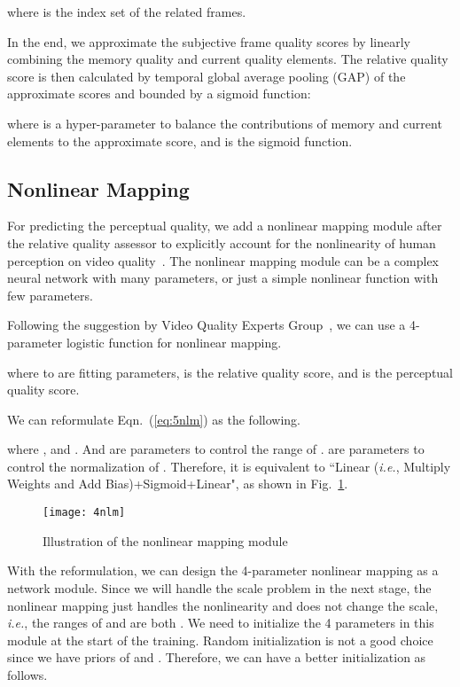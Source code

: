 \documentclass[twocolumn]{svjour3}          \smartqed  \usepackage{graphicx}
\begin{document}
where  is the index set of the related frames.

In the end, we approximate the subjective frame quality scores by linearly combining the memory quality and current quality elements. 
The relative quality score  is then calculated by temporal global average pooling (GAP) of the approximate scores and bounded by a sigmoid function:


where  is a hyper-parameter to balance the contributions of memory and current elements to the approximate score, and  is the sigmoid function.

\subsection{Nonlinear Mapping}
For predicting the perceptual quality, we add a nonlinear mapping module after the relative quality assessor to explicitly account for the nonlinearity of human perception on video quality~\citep{vqeg2000fr}. 
The nonlinear mapping module can be a complex neural network with many parameters, or just a simple nonlinear function with few parameters. 

Following the suggestion by Video Quality Experts Group~\citep{vqeg2000fr}, we can use a 4-parameter logistic function for nonlinear mapping.

where  to  are fitting parameters,  is the relative quality score, and  is the perceptual quality score.

We can reformulate Eqn.~(\ref{eq:5nlm}) as the following.

where , and . 
And  are parameters to control the range of .  are parameters to control the normalization of . 
Therefore, it is equivalent to ``Linear (\textit{i.e.}, Multiply Weights and Add Bias)+Sigmoid+Linear", as shown in Fig.~\ref{fig:nlm}. 

\begin{figure}[!htb]
\begin{center}
\texttt{[image: 4nlm]}\end{center}
   \caption{Illustration of the nonlinear mapping module}
\label{fig:nlm}
\end{figure}

With the reformulation, we can design the 4-parameter nonlinear mapping as a network module.
Since we will handle the scale problem in the next stage, the nonlinear mapping just handles the nonlinearity and does not change the scale, \textit{i.e.}, the ranges of  and  are both . 
We need to initialize the 4 parameters in this module at the start of the training. 
Random initialization is not a good choice since we have priors of  and .
Therefore, we can have a better initialization as follows.
\end{document}
